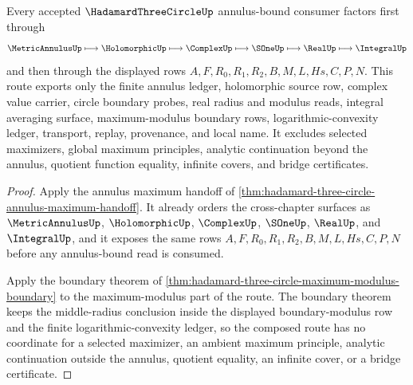 \begin{theorem}
\label{thm:hadamard-three-circle-annulus-route}
Every accepted $\HadamardThreeCircleUp$ annulus-bound consumer factors first through
$$
\MetricAnnulusUp \longmapsto \HolomorphicUp \longmapsto \ComplexUp \longmapsto \SOneUp \longmapsto \RealUp \longmapsto \IntegralUp
$$
and then through the displayed rows $A,F,R_0,R_1,R_2,B,M,L,Hs,C,P,N$. This route exports only the finite annulus ledger, holomorphic source row, complex value carrier, circle boundary probes, real radius and modulus reads, integral averaging surface, maximum-modulus boundary rows, logarithmic-convexity ledger, transport, replay, provenance, and local name. It excludes selected maximizers, global maximum principles, analytic continuation beyond the annulus, quotient function equality, infinite covers, and bridge certificates.
\end{theorem}
\begin{proof}
Apply the annulus maximum handoff of \autoref{thm:hadamard-three-circle-annulus-maximum-handoff}. It already orders the cross-chapter surfaces as $\MetricAnnulusUp$, $\HolomorphicUp$, $\ComplexUp$, $\SOneUp$, $\RealUp$, and $\IntegralUp$, and it exposes the same rows $A,F,R_0,R_1,R_2,B,M,L,Hs,C,P,N$ before any annulus-bound read is consumed.

Apply the boundary theorem of \autoref{thm:hadamard-three-circle-maximum-modulus-boundary} to the maximum-modulus part of the route. The boundary theorem keeps the middle-radius conclusion inside the displayed boundary-modulus row and the finite logarithmic-convexity ledger, so the composed route has no coordinate for a selected maximizer, an ambient maximum principle, analytic continuation outside the annulus, quotient equality, an infinite cover, or a bridge certificate.
\end{proof}



